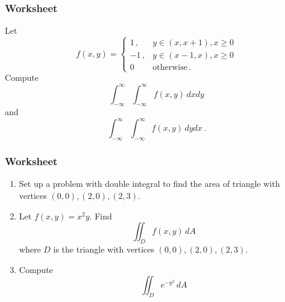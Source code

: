 \documentclass[aspectratio=169]{beamer}
\begin{document}
        \begin{frame}
    \frametitle{Worksheet}

        Let
           \begin{equation*}
                f(x,y) = \begin{cases}
                    1 \,, & y \in (x,x+1), x\geq 0 \\
                    -1 \,, & y \in (x-1, x) , x\geq 0 \\
                    0 & \text{otherwise} \,.
                \end{cases}
            \end{equation*} 
            Compute
            \begin{equation*}
                \int_{-\infty}^\infty \int_{-\infty}^\infty f(x,y) \, dx dy
            \end{equation*}
            and
            \begin{equation*}
                \int_{-\infty}^\infty \int_{-\infty}^\infty f(x,y) \, dy dx \,.
            \end{equation*}
\end{frame}
\begin{frame}
    \frametitle{Worksheet}
    \begin{enumerate}
        \item Set up a problem with double integral to find the area of triangle with vertices $(0,0), (2,0), (2,3)$.
        \item Let $f(x,y) = x^2y$. Find
            \begin{equation*}
                \iint_D f(x,y) \, dA
            \end{equation*}
            where $D$ is the triangle with vertices $(0,0), (2,0), (2,3)$.
        \item Compute 
            $$ \iint_D e^{-y^2} \, dA $$
    \end{enumerate}
\end{frame}
\end{document}
